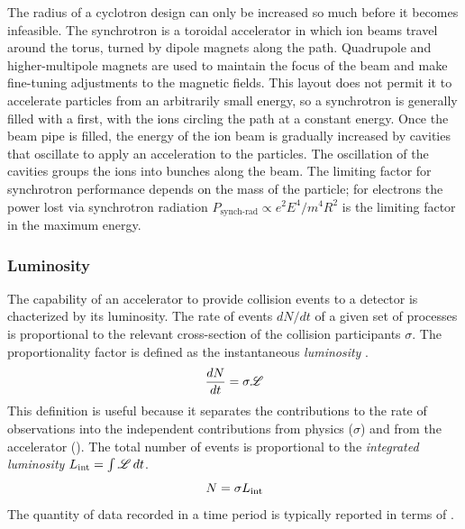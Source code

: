 The radius of a cyclotron design can only be increased so much before it becomes infeasible.
The synchrotron is a toroidal accelerator in which ion beams travel around the torus, turned by dipole magnets along the path.
Quadrupole and higher-multipole magnets are used to maintain the focus of the beam and make fine-tuning adjustments to the magnetic fields.
This layout does not permit it to accelerate particles from an arbitrarily small energy, so a synchrotron is generally filled with a \linac first, with the ions circling the path at a constant energy.
Once the beam pipe is filled, the energy of the ion beam is gradually increased by \rf cavities that oscillate to apply an acceleration to the particles.
The oscillation of the \rf cavities groups the ions into bunches along the beam.
The limiting factor for synchrotron performance depends on the mass of the particle; for electrons the power lost via synchrotron radiation $P_\textrm{synch-rad} \propto e^2 E^4 / m^4 R^2 $ is the limiting factor in the maximum energy.

\subsubsection{Luminosity}

The capability of an accelerator to provide collision events to a detector is chacterized by its luminosity.
The rate of events $dN/dt$ of a given set of processes is proportional to the relevant cross-section of the collision participants $\sigma$.
The proportionality factor is defined as the instantaneous \emph{luminosity} \Lumi.
\begin{equation}
\label{eq:rate_lumi}
\frac{dN}{dt} = \sigma \mathscr{L}
\end{equation}
This definition is useful because it separates the contributions to the rate of observations into the independent contributions from physics ($\sigma$) and from the accelerator (\Lumi).
The total number of events is proportional to the \emph{integrated luminosity} $L_\mathrm{int} = \int \mathscr{L} \, dt$.
\begin{equation}
N = \sigma L_\mathrm{int}
\end{equation}
The quantity of data recorded in a time period is typically reported in terms of \Lint.

